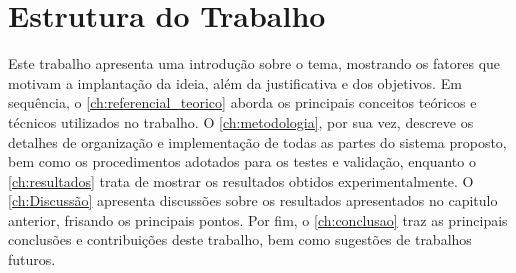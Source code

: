 
\section{Estrutura do Trabalho}

Este trabalho apresenta uma introdução sobre o tema, mostrando os fatores que motivam a implantação da ideia, além da justificativa e dos objetivos. Em sequência, o \autoref{ch:referencial_teorico} aborda os principais conceitos teóricos e técnicos utilizados no trabalho. O \autoref{ch:metodologia}, por sua vez, descreve os detalhes de organização e implementação de todas as partes do sistema proposto, bem como os procedimentos adotados para os testes e validação, enquanto o \autoref{ch:resultados} trata de mostrar os resultados obtidos experimentalmente. O \autoref{ch:Discussão} apresenta discussões sobre os resultados apresentados no capitulo anterior, frisando os principais pontos. Por fim, o \autoref{ch:conclusao} traz as principais conclusões e contribuições deste trabalho, bem como sugestões de trabalhos futuros.

